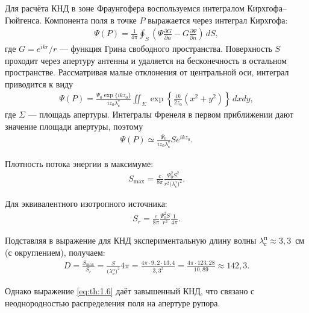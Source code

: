 Для расчёта КНД в зоне Фраунгофера воспользуемся интегралом Кирхгофа--Гюйгенса. Компонента поля в точке $P$ выражается через интеграл Кирхгофа:
\begin{align} \label{eq:th:1.1}
	\Psi(P) = \frac{1}{4\pi} \oint_S \left(\Psi \frac{\partial G}{\partial n} - G \frac{\partial \Psi}{\partial n}\right)\, dS,
\end{align}
где $G = e^{ikr}/r$ --- функция Грина свободного пространства. Поверхность $S$ проходит через апертуру антенны и удаляется на бесконечность в остальном пространстве. Рассматривая малые отклонения от центральной оси, интеграл приводится к виду
\begin{align} \label{eq:th:1.2}
	\Psi(P) = \frac{\Psi_0 \exp \{ikz_0\}}{i z_0 {\lambda^{\text{т}}_{\text{с}}}} \iint_\Sigma \exp \left\{\frac{ik}{2z_0}(x^2 + y^2)\right\}\, dxdy,
\end{align}
где $\Sigma$ --- площадь апертуры. Интегралы Френеля в первом приближении дают значение площади апертуры, поэтому
\begin{align} \label{eq:th:1.3}
	\Psi(P) \simeq \frac{\Psi_0}{i z_0 {\lambda^{\text{т}}_{\text{с}}}} S e^{ikz_0}.
\end{align}

Плотность потока энергии в максимуме:
\begin{align} \label{eq:th:1.4}
	S_{\max} = \frac{c}{8\pi} \frac{\Psi_0^2 S^2}{r^2 \bigl(\lambda^{\text{т}}_{\text{с}}\bigr)^2}.
\end{align}

Для эквивалентного изотропного источника:
\begin{align}\label{eq:th:1.5}
	S_r = \frac{c}{8\pi} \frac{\Psi_0^2 S}{r^2} \frac{1}{4\pi}.
\end{align}

Подставляя в выражение для КНД экспериментальную длину волны ${\lambda^{\text{п}}_{\text{с}}} \approx 3{,}3$~см (с округлением), получаем:
\begin{align} \label{eq:th:1.6}
	D = \frac{S_{\max}}{S_r} = \frac{S}{\bigl(\lambda^{\text{п}}_{\text{с}}\bigr)^2} 4 \pi
	= \frac{4\pi \cdot 9{,}2 \cdot 13{,}4}{3{,}3^2}
	= \frac{4\pi \cdot 123{,}28}{10{,}89}
	\approx 142{,}3.
\end{align}

Однако выражение \cref{eq:th:1.6} даёт завышенный КНД, что связано с неоднородностью распределения поля на апертуре рупора.
